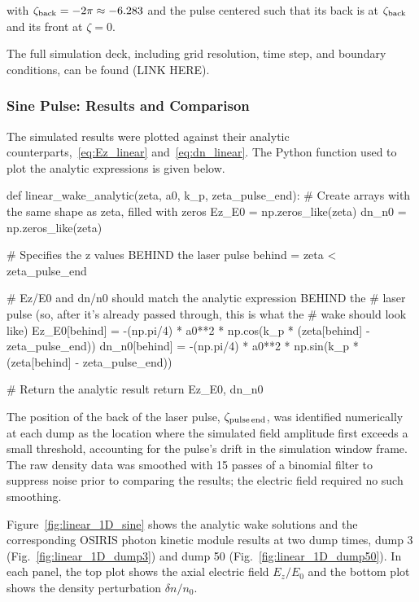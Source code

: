     with $\zeta_{\rm back} = -2\pi \approx -6.283$ and the pulse
    centered such that its back is at $\zeta_{\rm back}$ and its front at
    $\zeta = 0$.
    \vspace{1em}
    
    The full simulation deck, including grid resolution, time step, and boundary
    conditions, can be found (LINK HERE).

    \subsubsection{Sine Pulse: Results and Comparison}

    The simulated results were plotted against their analytic 
    counterparts,~\eqref{eq:Ez_linear} and~\eqref{eq:dn_linear}. The Python
    function used to plot the analytic expressions is given below. 

    \begin{pythoncode}
    def linear_wake_analytic(zeta, a0, k_p, zeta_pulse_end):
        # Create arrays with the same shape as zeta, filled with zeros
        Ez_E0 = np.zeros_like(zeta)
        dn_n0 = np.zeros_like(zeta)

        # Specifies the z values BEHIND the laser pulse
        behind = zeta < zeta_pulse_end

        # Ez/E0 and dn/n0 should match the analytic expression BEHIND the
        # laser pulse (so, after it's already passed through, this is what the
        # wake should look like)
        Ez_E0[behind] = -(np.pi/4) * a0**2 * np.cos(k_p * (zeta[behind] - zeta_pulse_end))
        dn_n0[behind] = -(np.pi/4) * a0**2 * np.sin(k_p * (zeta[behind] - zeta_pulse_end))

        # Return the analytic result
        return Ez_E0, dn_n0
    \end{pythoncode}

    The position of the back of the laser pulse, $\zeta_{\rm pulse\,end}$, was
    identified numerically at each dump as the location where the simulated
    field amplitude first exceeds a small threshold, accounting for the pulse's
    drift in the simulation window frame. The raw density data was smoothed with
    15 passes of a binomial filter to suppress noise prior to comparing the
    results; the electric field required no such smoothing.
    \vspace{1em}

    Figure~\ref{fig:linear_1D_sine} shows the analytic wake solutions and the 
    corresponding OSIRIS photon kinetic module results at two dump times, dump
    3 (Fig.~\ref{fig:linear_1D_dump3}) and dump 50 (Fig.~\ref{fig:linear_1D_dump50}).
    In each panel, the top plot shows the axial electric field $E_z / E_0$ 
    and the bottom plot shows the density perturbation $\delta n / n_0$. 

